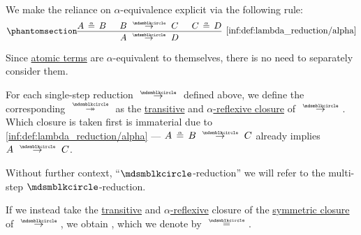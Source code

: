 \begin{definition}
\begin{thmenum}
    We make the reliance on \( \alpha \)-equivalence explicit via the following rule:
    \begin{equation*}\taglabel[\ensuremath{ \logic{Alpha}_{\Anon} }]{inf:def:lambda_reduction/alpha}
      \begin{prooftree}
        \hypo{ A \aequiv B }
        \hypo{ B \pred C }
        \hypo{ C \aequiv D }
        \infer3[\ref{inf:def:lambda_reduction/alpha}]{ A \pred D }.
      \end{prooftree}
    \end{equation*}

    Since \hyperref[def:simple_type_system/atom]{atomic terms} are \( \alpha \)-equivalent to themselves, there is no need to separately consider them.

     For each single-step reduction \( {\pred} \) defined above, we define the corresponding  \( {\pred*} \) as the \hyperref[def:relation_closures/transitive]{transitive} and \hyperref[def:alpha_reflexive]{\( \alpha \)-reflexive closure} of \( {\pred} \). Which closure is taken first is immaterial due to \ref{inf:def:lambda_reduction/alpha} --- \( A \aequiv B \pred C \) already implies \( A \pred C \).

    Without further context, \enquote{\( {\Anon} \)-reduction} we will refer to the multi-step \( {\Anon} \)-reduction.

     If we instead take the
    \hyperref[def:relation_closures/transitive]{transitive} and \hyperref[def:alpha_reflexive]{\( \alpha \)-reflexive} closure of the \hyperref[def:relation_closures/symmetric]{symmetric closure} of \( \pred \), we obtain , which we denote by \( {\equivrel{\Anon}} \).
  \end{thmenum}
\end{definition}

